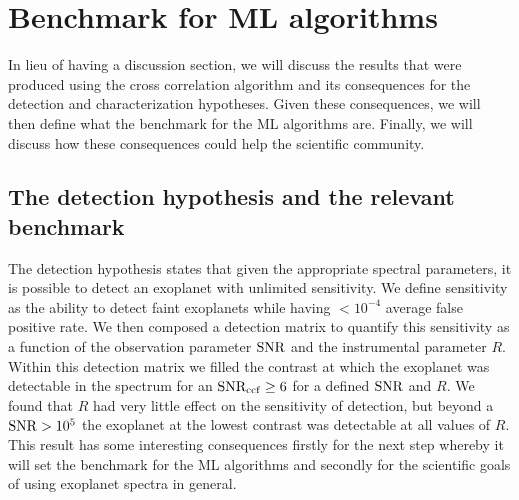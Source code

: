 \section{Benchmark for ML algorithms}
In lieu of having a discussion section, we will discuss the results that were produced using the cross correlation algorithm and its consequences for the detection and characterization hypotheses.
Given these consequences, we will then define what the benchmark for the ML algorithms are. 
Finally, we will discuss how these consequences could help the scientific community.
\subsection{The detection hypothesis and the relevant benchmark}
The detection hypothesis states that given the appropriate spectral parameters, it is possible to detect an exoplanet with unlimited sensitivity.
We define sensitivity as the ability to detect faint exoplanets while having $<10^{-4}$ average false positive rate.
We then composed a detection matrix to quantify this sensitivity as a function of the observation parameter $\rm{SNR}$ and the instrumental parameter $R$.
Within this detection matrix we filled the contrast at which the exoplanet was detectable in the spectrum for an $\rm{SNR_{ccf}}\ge6$ for a defined $\rm{SNR}$ and $R$.
We found that $R$ had very little effect on the sensitivity of detection, but beyond a $\rm{SNR}>10^{5}$ the exoplanet at the lowest contrast was detectable at all values of $R$. 
This result has some interesting consequences firstly for the next step whereby it will set the benchmark for the ML algorithms and secondly for the scientific goals of using exoplanet spectra in general.

